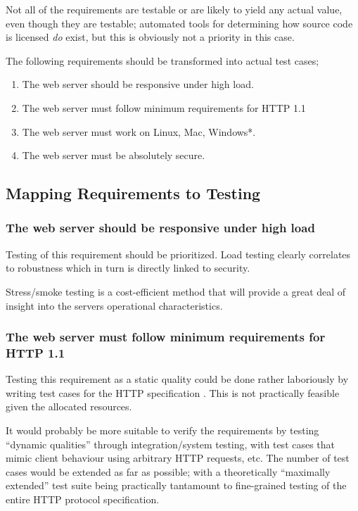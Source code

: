 Not all of the requirements are testable or are likely to yield any actual
value, even though they are testable; automated tools for determining how
source code is licensed \emph{do} exist, but this is obviously not a priority
in this case.

The following requirements should be transformed into actual test cases;
\begin{enumerate}
  \item The web server should be responsive under high load.
  \item The web server must follow minimum requirements for HTTP 1.1
  \item The web server must work on Linux, Mac, Windows*.
  \item The web server must be absolutely secure.
\end{enumerate}



\subsection{Mapping Requirements to Testing}
\subsubsection{The web server should be responsive under high load}
Testing of this requirement should be prioritized. Load testing clearly
correlates to robustness which in turn is directly linked to security.

Stress/smoke testing is a cost-efficient method that will provide a great deal
of insight into the servers operational characteristics.


\subsubsection{The web server must follow minimum requirements for HTTP 1.1}
Testing this requirement as a static quality could be done rather laboriously
by writing test cases for the HTTP specification \cite{rfc2616}. This is not
practically feasible given the allocated resources.

It would probably be more suitable to verify the requirements by testing
``dynamic qualities'' through integration/system testing, with test
cases that mimic client behaviour using arbitrary HTTP requests, etc.
The number of test cases would be extended as far as possible; with a
theoretically ``maximally extended'' test suite being practically tantamount to
fine-grained testing of the entire HTTP protocol specification.


